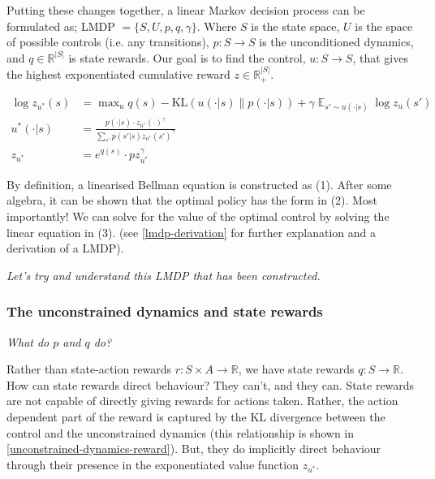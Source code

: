 

Putting these changes together, a linear Markov decision process can be formulated as;
LMDP $=\{S, U, p, q, \gamma\}$. Where $S$ is the state space, $U$ is the space of possible controls (i.e. any transitions),
$p: S \to S$ is the unconditioned dynamics, and $q \in \mathbb R^{|S|}$ is state rewards.
Our goal is to find the control, $u: S \to S$, that gives the highest exponentiated cumulative reward $z \in \mathbb R_+^{|S|}$.

\begin{align}
\log z_{u^{* }}(s) &= \mathop{\text{max}}_{u} q(s) - \text{KL}(u(\cdot| s) \parallel p(\cdot | s)) + \gamma \mathop{\mathbb E}_{s' \sim u(\cdot | s)} \log z_{u}(s') \tag{1}\\
u^{* }(\cdot | s) &= \frac{p(\cdot | s)\cdot z_{u^{* }}(\cdot)^{\gamma}}{\sum_{s'} p(s' | s) z_{u^{* }}(s')^{\gamma}} \tag{2}\\
z_{u^{* }} &= e^{q(s)}\cdot p z_{u^{* }}^{\gamma} \tag{3}
\end{align}

By definition, a linearised Bellman equation is constructed as (1). After some algebra,
it can be shown that the optimal policy has the form in (2).
Most importantly! We can solve for the value of the optimal control by solving the linear equation in (3).
(see \ref{lmdp-derivation} for further explanation and a derivation of a LMDP).

\begin{displayquote}
\textsl{Let's try and understand this LMDP that has been constructed.}
\end{displayquote}

\subsubsection{The unconstrained dynamics and state rewards}

\begin{displayquote}
\textsl{What do $p$ and $q$ do?}
\end{displayquote}

Rather than state-action rewards $r: S \times A \to \mathbb R$, we have state rewards $q: S \to \mathbb R$.
How can state rewards direct behaviour? They can't, and they can. State rewards are not capable of directly giving rewards for actions taken.
Rather, the action dependent part of the reward is captured by the KL divergence between
the control and the unconstrained dynamics (this relationship is shown in \ref{unconstrained-dynamics-reward}).
But, they do implicitly direct behaviour through their presence in the exponentiated value function $z_{u^{* }}$.

